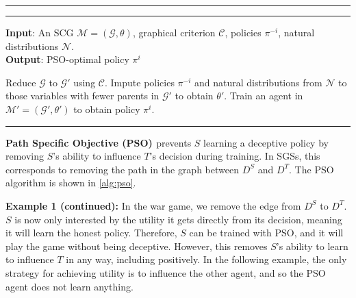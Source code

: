 \documentclass[submission,publicdomain,creativecommons noncommercial]{eptcs}
\begin{document}
\begin{table}
\vspace{-2mm}
\hrule
{}
\vspace{-3mm}
\hrule
 \label{alg:pso}
 \textbf{Input}: An SCG $\mathcal{M} = (\mathcal{G}, \theta)$, graphical criterion $\mathcal{C}$, policies $\pi^{-i}$, natural distributions $\mathcal{N}$. \\
\textbf{Output}: PSO-optimal policy $\pi^i$
\begin{algorithmic}[1] %
\STATE Reduce $\mathcal{G}$ to $\mathcal{G}'$ using $\mathcal{C}$. 
\STATE Impute policies $\pi^{-i}$ and natural distributions from $\mathcal{N}$ to those variables with fewer parents in $\mathcal{G}'$ to obtain $\theta'$.
\STATE Train an agent in $\mathcal{M}' = (\mathcal{G}', \theta')$ to obtain policy $\pi^i$.
\end{algorithmic}
\hrule
\end{table}

\textbf{Path Specific Objective (PSO) \cite{Farquhar2022Jun}}
prevents $S$ learning a deceptive policy by removing $S$'s ability to influence $T$'s decision during training. In SGSs, this corresponds to removing the path in the graph between $D^S$ and $D^T$. 
The PSO algorithm is shown in \cref{alg:pso}. 



\textbf{Example 1 (continued):} In the war game, we remove the edge from $D^S$ to $D^T$. $S$ is now only interested by the utility it gets directly from its decision, meaning it will learn the honest policy. Therefore, $S$ can be trained with PSO, and it will play the game without being deceptive. 
However, this removes $S$'s ability to learn to influence $T$ in any way, including positively. In the following example, the only strategy for achieving utility is to influence the other agent, and so the PSO agent does not learn anything. %
\end{document}
